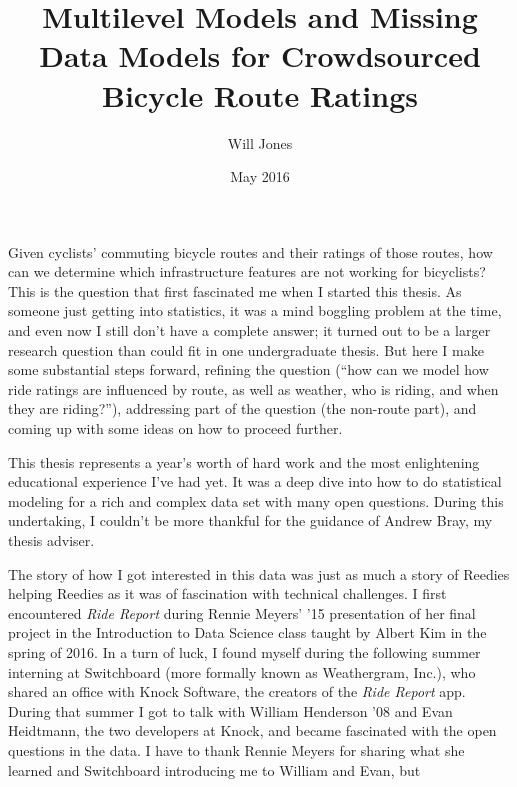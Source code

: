 \documentclass[12pt,twoside]{reedthesis}
\title{Multilevel Models and Missing Data Models for Crowdsourced Bicycle Route
Ratings}
\author{Will Jones}
\date{May 2016}
\begin{document}
      \maketitle
  
  \frontmatter %
  \pagestyle{empty} %

  
      \begin{preface}
      Given cyclists' commuting bicycle routes and their ratings of those
      routes, how can we determine which infrastructure features are not
      working for bicyclists? This is the question that first fascinated me
      when I started this thesis. As someone just getting into statistics, it
      was a mind boggling problem at the time, and even now I still don't have
      a complete answer; it turned out to be a larger research question than
      could fit in one undergraduate thesis. But here I make some substantial
      steps forward, refining the question (``how can we model how ride
      ratings are influenced by route, as well as weather, who is riding, and
      when they are riding?''), addressing part of the question (the non-route
      part), and coming up with some ideas on how to proceed further.
      \par This thesis represents a year's worth of hard work and the most
      enlightening educational experience I've had yet. It was a deep dive
      into how to do statistical modeling for a rich and complex data set with
      many open questions. During this undertaking, I couldn't be more
      thankful for the guidance of Andrew Bray, my thesis adviser. \par The
      story of how I got interested in this data was just as much a story of
      Reedies helping Reedies as it was of fascination with technical
      challenges. I first encountered \emph{Ride Report} during Rennie Meyers'
      '15 presentation of her final project in the Introduction to Data
      Science class taught by Albert Kim in the spring of 2016. In a turn of
      luck, I found myself during the following summer interning at
      Switchboard (more formally known as Weathergram, Inc.), who shared an
      office with Knock Software, the creators of the \emph{Ride Report} app.
      During that summer I got to talk with William Henderson '08 and Evan
      Heidtmann, the two developers at Knock, and became fascinated with the
      open questions in the data. I have to thank Rennie Meyers for sharing
      what she learned and Switchboard introducing me to William and Evan, but

\end{preface}
\end{document}
